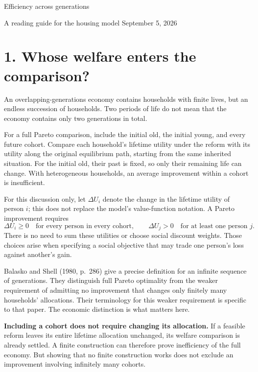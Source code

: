 \documentclass[11pt]{article}
\begin{document}
\begin{center}
{\LARGE Efficiency across generations}\par
\vspace{0.5em}
A reading guide for the housing model \quad September 5, 2026
\end{center}

\section*{1. Whose welfare enters the comparison?}

An overlapping-generations economy contains households with finite lives,
but an endless succession of households. Two periods of life do not mean
that the economy contains only two generations in total.

For a full Pareto comparison, include the initial old, the initial young,
and every future cohort. Compare each household's lifetime utility under the
reform with its utility along the original equilibrium path, starting from
the same inherited situation. For the initial old, their past is fixed, so
only their remaining life can change. With heterogeneous households, an
average improvement within a cohort is insufficient.

For this discussion only, let $\Delta U_i$ denote the change in the lifetime
utility of person $i$; this does not replace the model's value-function notation.
A Pareto improvement requires
\[
\Delta U_i\geq 0\quad\text{for every person in every cohort},
\qquad \Delta U_j>0\quad\text{for at least one person }j.
\]
There is no need to sum these utilities or choose social discount weights.
Those choices arise when specifying a social objective that may trade one
person's loss against another's gain.

Balasko and Shell (1980, p.~286) give a precise definition for an infinite
sequence of generations. They distinguish full Pareto optimality from the
weaker requirement of admitting no improvement that changes only finitely
many households' allocations. Their terminology for this weaker requirement
is specific to that paper. The economic distinction is what matters here.

\textbf{Including a cohort does not require changing its allocation.}
If a feasible reform leaves its entire lifetime allocation unchanged, its
welfare comparison is already settled. A finite construction can therefore
prove inefficiency of the full economy. But showing that no finite
construction works does not exclude an improvement involving infinitely many
cohorts.
\end{document}
